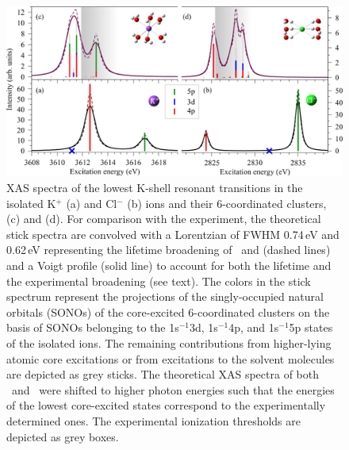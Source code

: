 \begin{figure}[h!]
\centering
\includegraphics[scale=0.55]{figures/xas_spectra.eps}
\caption{XAS spectra of the lowest K-shell resonant transitions in the isolated K$^{+}$ (a) and Cl$^{-}$ (b) ions and their 6-coordinated clusters, (c) and (d). For comparison with the experiment, the theoretical stick spectra are convolved with a Lorentzian of FWHM 0.74\,eV and 0.62\,eV representing the lifetime broadening of \ki~and \cli \citep{Krause79:329} (dashed lines) and a Voigt profile (solid line) to account for both the lifetime and the experimental broadening (see text). The colors in the stick spectrum represent the projections of the singly-occupied natural orbitals (SONOs) of the core-excited 6-coordinated clusters on the basis of SONOs belonging to the 1s$^{-1}$3d, 1s$^{-1}$4p, and 1s$^{-1}$5p states of the isolated ions. The remaining contributions from higher-lying atomic core excitations or from excitations to the solvent molecules are depicted as grey sticks. The theoretical XAS spectra of both \ki~and \cli~were shifted to higher photon energies such that the energies of the lowest core-excited states correspond to the experimentally determined ones. The experimental ionization thresholds are depicted as grey boxes.}
\label{fg:xas_kcl}
\end{figure}


